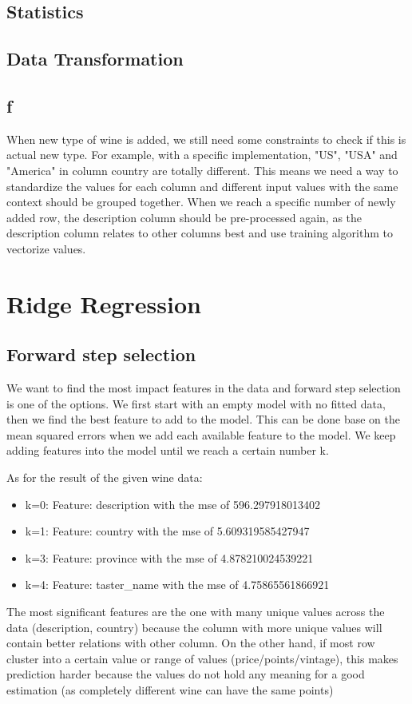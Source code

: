 \documentclass[11pt]{article}
\begin{document}
\subsection{Statistics}

\subsection{Data Transformation}

\subsection{f}

When new type of wine is added, we still need some constraints to check if this is actual new type. For example, with a specific implementation, "US", "USA" and "America" in column country are totally different. This means we need a way to standardize the values for each column and different input values with the same context should be grouped together. When we reach a specific number of newly added row, the description column should be pre-processed again, as the description column relates to other columns best and use training algorithm to vectorize values.
\section{Ridge Regression}

\subsection{Forward step selection}
We want to find the most impact features in the data and forward step selection is one of the options. We first start with an empty model with no fitted data, then we find the best feature to add to the model. This can be done base on the mean squared errors when we add each available feature to the model. We keep adding features into the model until we reach a certain number k.

As for the result of the given wine data:
\begin{itemize}
    \item k=0: Feature: description with the mse of 596.297918013402
    \item k=1: Feature: country with the mse of 5.609319585427947
    \item k=3: Feature: province with the mse of 4.878210024539221
    \item k=4: Feature: taster\_name with the mse of 4.75865561866921
\end{itemize}

The most significant features are the one with many unique values across the data (description, country) because the column with more unique values will contain better relations with other column. On the other hand, if most row cluster into a certain value or range of values (price/points/vintage), this makes prediction harder because the values do not hold any meaning for a good estimation (as completely different wine can have the same points)

\end{document}
